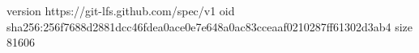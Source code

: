version https://git-lfs.github.com/spec/v1
oid sha256:256f7688d2881dcc46fdea0ace0e7e648a0ac83cceaaf0210287ff61302d3ab4
size 81606
